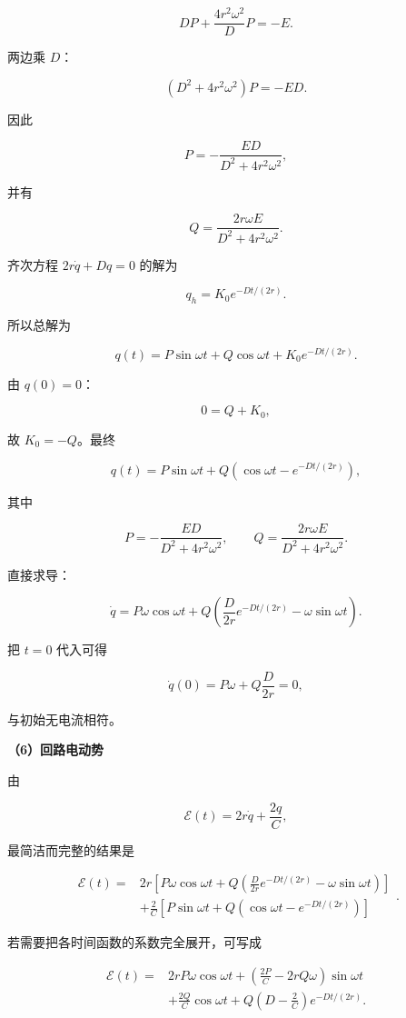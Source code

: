 \documentclass[12pt,a4paper,UTF8]{ctexart}
\begin{document}
\[
DP+\frac{4r^2\omega^2}{D}P=-E.
\]

两边乘 \(D\)：

\[
(D^2+4r^2\omega^2)P=-ED.
\]

因此

\[
\boxed{P=-\frac{ED}{D^2+4r^2\omega^2}},
\]

并有

\[
\boxed{Q=\frac{2r\omega E}{D^2+4r^2\omega^2}}.
\]

齐次方程 \(2r\dot q+Dq=0\) 的解为

\[q_h=K_0e^{-Dt/(2r)}.\]

所以总解为

\[
q(t)=P\sin\omega t+Q\cos\omega t+K_0e^{-Dt/(2r)}.
\]

由 \(q(0)=0\)：

\[0=Q+K_0,\]

故 \(K_0=-Q\)。最终

\[
\boxed{
q(t)=P\sin\omega t+Q\left(\cos\omega t-e^{-Dt/(2r)}\right)
},
\]

其中

\[
P=-\frac{ED}{D^2+4r^2\omega^2},
\qquad
Q=\frac{2r\omega E}{D^2+4r^2\omega^2}.
\]

直接求导：

\[
\boxed{
\dot q=P\omega\cos\omega t
+Q\left(\frac{D}{2r}e^{-Dt/(2r)}-\omega\sin\omega t\right)
}.
\]

把 \(t=0\) 代入可得

\[
\dot q(0)=P\omega+Q\frac{D}{2r}=0,
\]

与初始无电流相符。

\textbf{（6）回路电动势}

由

\[\mathcal E(t)=2r\dot q+\frac{2q}{C},\]

最简洁而完整的结果是

\[
\boxed{
\begin{aligned}
\mathcal E(t)={}&
2r\left[P\omega\cos\omega t
+Q\left(\frac{D}{2r}e^{-Dt/(2r)}-\omega\sin\omega t\right)\right]
\\
&+\frac2C\left[P\sin\omega t
+Q\left(\cos\omega t-e^{-Dt/(2r)}\right)\right]
\end{aligned}
}.
\]

若需要把各时间函数的系数完全展开，可写成

\[
\boxed{
\begin{aligned}
\mathcal E(t)
={}&2rP\omega\cos\omega t
+\left(\frac{2P}{C}-2rQ\omega\right)\sin\omega t\\
&+\frac{2Q}{C}\cos\omega t
+Q\left(D-\frac2C\right)e^{-Dt/(2r)}.
\end{aligned}}
\]
\end{document}
